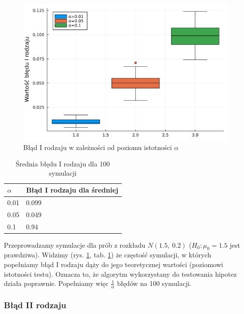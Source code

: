 \documentclass{article}
\theoremstyle{break}
\begin{document}
\begin{figure}[H]
	\begin{center}
		\includegraphics[scale=0.5]{Z3.Irodzaj.png}
		\caption{Błąd I rodzaju w zależności od poziomu istotności $\alpha$}
		\label{fig:7}
	\end{center}
\end{figure}

\begin{table}[H]
	\begin{center}
	\begin{tabular}{|l|l|}
		\hline
		\rowcolor[HTML]{EFEFEF} 
		$\alpha$ & Błąd I rodzaju dla średniej \\ \hline
		0.01 & 0.099                         \\ \hline
		0.05 & 0.049                         \\ \hline
		0.1  & 0.94                         \\ \hline
	\end{tabular}
\caption{Średnia błędu I rodzaju dla 100 symulacji}
\label{table:1}
	\end{center}
\end{table}

Przeprowadzamy symulacje dla prób z rozkładu $N(1.5,~0.2)$ ($H_0: \mu_0 = 1.5$ jest prawdziwa). Widzimy (rys. \ref{fig:7}, tab. \ref{table:1}) że częstość symulacji, w których popełniamy błąd I rodzaju dąży do jego teoretycznej wartości (poziomowi istotności testu). Oznacza to, że algorytm wykorzystany do testowania hipotez działa poprawnie. Popełniamy więc $\frac{1}{\alpha}$ błędów na 100 symulacji.
\newpage
\subsubsection*{Błąd II rodzaju}
\end{document}
